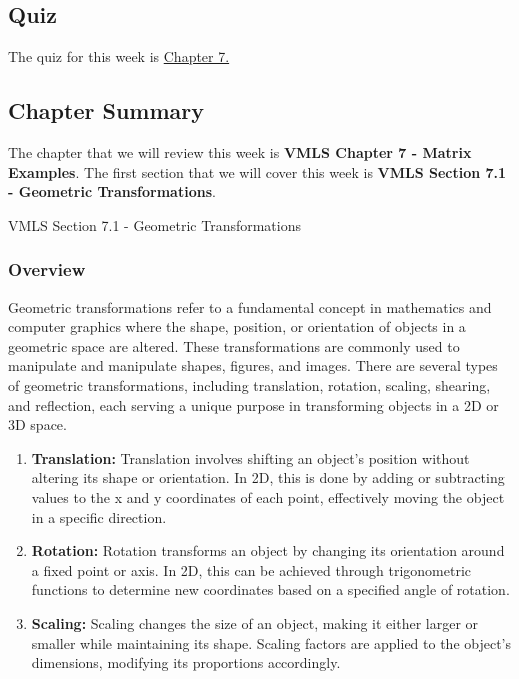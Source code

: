 \subsection{Quiz}

The quiz for this week is \href{https://applied.cs.colorado.edu/mod/quiz/view.php?id=50753}{Chapter 7.}  

\subsection{Chapter Summary}

The chapter that we will review this week is \textbf{VMLS Chapter 7 - Matrix Examples}. The first section that we will cover this week is \textbf{VMLS Section 7.1 - Geometric Transformations}.

\begin{notes}{VMLS Section 7.1 - Geometric Transformations}
    \subsubsection*{Overview}

    Geometric transformations refer to a fundamental concept in mathematics and computer graphics where the shape, position, or orientation of objects in a geometric space are altered. These transformations 
    are commonly used to manipulate and manipulate shapes, figures, and images. There are several types of geometric transformations, including translation, rotation, scaling, shearing, and reflection, each 
    serving a unique purpose in transforming objects in a 2D or 3D space.

    \begin{enumerate}
        \item \textbf{Translation:} Translation involves shifting an object's position without altering its shape or orientation. In 2D, this is done by adding or subtracting values to the x and y coordinates 
        of each point, effectively moving the object in a specific direction.
        
        \item \textbf{Rotation:} Rotation transforms an object by changing its orientation around a fixed point or axis. In 2D, this can be achieved through trigonometric functions to determine new coordinates 
        based on a specified angle of rotation.
        
        \item \textbf{Scaling:} Scaling changes the size of an object, making it either larger or smaller while maintaining its shape. Scaling factors are applied to the object's dimensions, modifying its 
        proportions accordingly.
        

\end{enumerate}
\end{notes}
